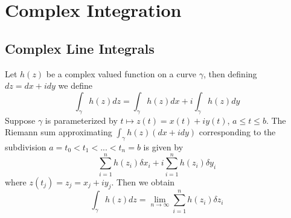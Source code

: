 %
%
%
\chapter{Complex Integration}
\label{CompInt} %

\section{Complex Line Integrals}

Let $h(z)$ be a complex valued function on a curve $\gamma$, then defining $dz = dx+idy$ we define \begin{equation*}
    \int_{\gamma}h(z)dz = \int_{\gamma}h(z)dx + i\int_{\gamma}h(z)dy
\end{equation*}
Suppose $\gamma$ is parameterized by $t \mapsto z(t) = x(t)+iy(t)$, $a \leq t \leq b$. The Riemann sum approximating $\int_{\gamma}h(z)(dx+idy)$ corresponding to the subdivision $a = t_0 < t_1 < ... < t_n = b$ is given by \begin{equation*}
    \sum_{i=1}^nh(z_i)\delta x_i+i\sum_{i=1}^nh(z_i)\delta y_i
\end{equation*}
where $z(t_j) = z_j = x_j + iy_j$. Then we obtain \begin{equation*}
    \int_{\gamma}h(z)dz = \lim\limits_{n\rightarrow \infty}\sum_{i=1}^nh(z_i)\delta z_i
\end{equation*}


